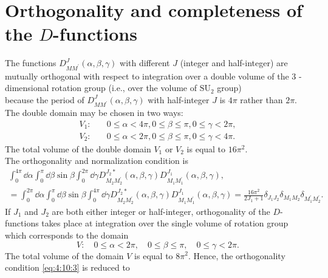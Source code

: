 \section{Orthogonality and completeness of the $D$-functions}\label{sec:4.10}
The functions $D_{M M^{\prime}}^{J}(\alpha, \beta, \gamma)$ with different $J$ (integer and half-integer) are mutually orthogonal with respect to integration over a double volume of the 3 -dimensional rotation group (i.e., over the volume of $\mathrm{SU}_{2}$ group)\\
because the period of $D_{M M^{\prime}}^{J}(\alpha, \beta, \gamma)$ with half-integer $J$ is $4 \pi$ rather than $2 \pi$. The double domain may be chosen in two ways:
\begin{align}
V_{1}: &\quad 0 \leq \alpha<4 \pi,  0 \leq \beta \leq \pi, 0\leq\gamma< 2\pi,\label{eq:4:10:1}\\ 
V_{2}: & \quad  0 \leq \alpha<2 \pi ,
 0 \leq \beta \leq \pi,  0 \leq \gamma<4 \pi.
\end{align}
The total volume of the double domain $V_{1}$ or $V_{2}$ is equal to $16 \pi^{2}$.\\
The orthogonality and normalization condition is
\begin{multline}
\int_{0}^{4 \pi} \dd \alpha \int_{0}^{\pi} \dd \beta \sin \beta \int_{0}^{2 \pi} \dd \gamma D_{M_{2} M_{2}^{\prime}}^{J_{2} *}(\alpha, \beta, \gamma) D_{M_{1} M_{1}^{\prime}}^{J_{1}}(\alpha, \beta, \gamma) , \\
=\int_{0}^{2 \pi} \dd \alpha \int_{0}^{\pi} \dd \beta \sin \beta \int_{0}^{4 \pi} \dd \gamma D_{M_{2} M_{2}^{\prime}}^{J_{2} *}(\alpha, \beta, \gamma) D_{M_{1} M_{1}^{\prime}}^{J_{1}}(\alpha, \beta, \gamma)=\frac{16 \pi^{2}}{2 J_{1}+1} \delta_{J_{1} J_{2}} \delta_{M_{1} M_{2}} \delta_{M_{1}^{\prime} M_{2}^{\prime}} \label{eq:4:10:3}.
\end{multline}
If $J_{1}$ and $J_{2}$ are both either integer or half-integer, orthogonality of the $D$-functions takes place at integration over the single volume of rotation group which corresponds to the domain
\begin{equation}
V: \quad 0 \leq \alpha<2 \pi, \quad 0 \leq \beta \leq \pi, \quad 0 \leq \gamma<2 \pi . \label{eq:4:10:4}
\end{equation}
The total volume of the domain $V$ is equal to $8 \pi^{2}$. Hence, the orthogonality condition \eqref{eq:4:10:3} is reduced to
